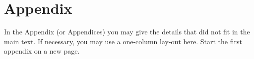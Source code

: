 \section{Appendix}\label{ap:appendix}
In the Appendix (or Appendices) you may give the details that did not fit in the main text. If necessary, you may use a one-column lay-out here. Start the first appendix on a new page.
